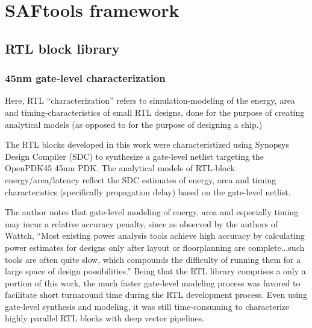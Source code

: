 \chapter{SAFtools framework}


\section{RTL block library}


\subsection{45nm gate-level characterization}

Here, RTL ``characterization'' refers to simulation-modeling of the energy, area and timing-characteristics of small RTL designs, done for the purpose of creating analytical models (as opposed to for the purpose of designing a chip.)

The RTL blocks developed in this work were characteristized using Synopsys Design Compiler (SDC) to synthesize a gate-level netlist targeting the OpenPDK45 45nm PDK. The analytical models of RTL-block energy/area/latency reflect the SDC estimates of energy, area and timing characteristics (specifically propagation delay) based on the gate-level netlist.

The author notes that gate-level modeling of energy, area and especially timing may incur a relative accuracy penalty, since as observed by the authors of Wattch\cite{wattch}, ``Most existing power analysis tools achieve high accuracy by calculating power estimates for designs only after layout or floorplanning are complete...such tools are often quite slow, which compounds the difficulty of running them for a large space of design possibilities.'' Being that the RTL library comprises a only a portion of this work, the much faster gate-level modeling process was favored to facilitate short turnaround time during the RTL development process. Even using gate-level synthesis and modeling, it was still time-consuming to characterize highly parallel RTL blocks with deep vector pipelines. 

